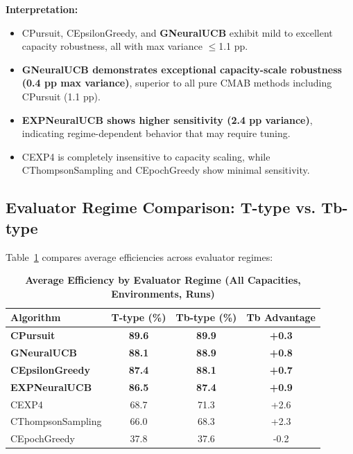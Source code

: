 \documentclass[12pt,a4paper]{article}
\newcommand{\performance}[1]{\textcolor{performancecolor}{\textbf{#1}}}
\newcommand{\legacy}[1]{\textcolor{legacycolor}{\textbf{#1}}}
\newcommand{\neural}[1]{\textcolor{neuralcolor}{\textbf{#1}}}
\begin{document}
\textbf{Interpretation:}
\begin{itemize}
\item CPursuit, CEpsilonGreedy, and \neural{GNeuralUCB} exhibit mild to excellent capacity robustness, all with max variance $\leq$1.1 pp.
\item \neural{GNeuralUCB demonstrates exceptional capacity-scale robustness (0.4 pp max variance)}, superior to all pure CMAB methods including CPursuit (1.1 pp).
\item \legacy{EXPNeuralUCB shows higher sensitivity (2.4 pp variance)}, indicating regime-dependent behavior that may require tuning.
\item CEXP4 is completely insensitive to capacity scaling, while CThompsonSampling and CEpochGreedy show minimal sensitivity.
\end{itemize}

\subsection{Evaluator Regime Comparison: T-type vs. Tb-type}

Table~\ref{tab:regime-comparison} compares average efficiencies across evaluator regimes:

\begin{table}[H]
\centering
\caption{\performance{Average Efficiency by Evaluator Regime (All Capacities, Environments, Runs)}}
\label{tab:regime-comparison}
\begin{tabular}{|l|c|c|c|}
\hline
\textbf{Algorithm} & \textbf{T-type (\%)} & \textbf{Tb-type (\%)} & \textbf{Tb Advantage} \\
\hline
\hline
\performance{CPursuit}        & \performance{89.6} & \performance{89.9} & \performance{+0.3} \\
\neural{GNeuralUCB}          & \neural{88.1} & \neural{88.9} & \neural{+0.8} \\
\performance{CEpsilonGreedy} & \performance{87.4} & \performance{88.1} & \performance{+0.7} \\
\legacy{EXPNeuralUCB}        & \legacy{86.5}     & \legacy{87.4}     & \legacy{+0.9} \\
CEXP4                        & 68.7              & 71.3              & +2.6 \\
CThompsonSampling            & 66.0              & 68.3              & +2.3 \\
CEpochGreedy                 & 37.8              & 37.6              & -0.2 \\
\hline
\end{tabular}
\end{table}
\end{document}
